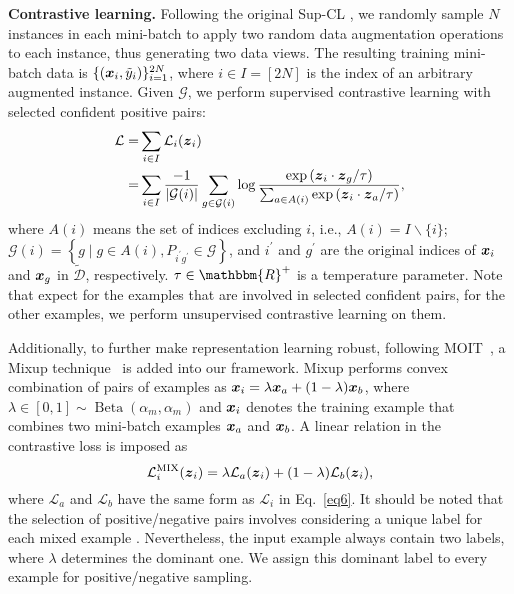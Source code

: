\documentclass[10pt,twocolumn,letterpaper]{article}
\newcommand{\myPara}[1]{\vspace{.05in}\noindent\textbf{#1}}
\newcommand{\bm}[1]{\mbox{\boldmath{$#1$}}}
\begin{document}
\myPara{Contrastive learning.} Following the original Sup-CL \cite{Khosla2020}, we randomly sample $N$ instances in each mini-batch to apply two random data augmentation operations to each instance, thus generating two data views. The resulting training mini-batch data is $\{(\bm{x}_i, \tilde{y}_i)\}^{2N}_{i=1}$, where $i \in I=[2N]$ is the index of an arbitrary augmented instance.
Given $\mathcal{G}$, we perform supervised contrastive learning with selected confident positive pairs:
\begin{equation}\label{eq6}
	\begin{split}
	\mathcal{L}=&\sum_{i \in I}\mathcal{L}_i(\bm{z}_i)\\
	=&\sum_{i \in I} \frac{-1}{|\mathcal{G}(i)|} \sum_{g \in \mathcal{G}(i)} \log \frac{\exp \left(\bm{z}_i \cdot \bm{z}_g / \tau\right)}{\sum_{a \in A(i)} \exp \left(\bm{z}_i \cdot \bm{z}_a / \tau\right)},
\end{split}
\end{equation}
where $A(i)$ means the set of indices excluding $i$, i.e., $A(i) = I \backslash\{i\}$; $\mathcal{G}(i) = \left\{g \mid g\in A(i), P_{i^{\prime}g^{\prime}} \in \mathcal{G} \right\}$, and $i^{\prime}$ and $g^{\prime}$ are the original indices of $\bm{x}_i$ and $\bm{x}_g$ in $\widetilde{\mathcal{D}}$, respectively. $\tau \in \mathbbm{R}^{+}$ is a temperature parameter. Note that expect for the examples that are involved in selected confident pairs, for the other examples, we perform unsupervised contrastive learning \cite{chen2020simple} on them.

Additionally, to further make representation learning robust, following MOIT~\cite{Ortego2021}, a Mixup technique~\cite{zhang2018mixup} is added into our framework. Mixup performs convex combination of pairs of examples as $\bm{x}_{i}=\lambda \bm{x}_{a}+(1-\lambda) \bm{x}_{b}$, where 
$\lambda \in[0,1] \sim \operatorname{Beta}(\alpha_m, \alpha_m)$ and $\bm{x}_i$ denotes the training example that combines two mini-batch examples $\bm{x}_a$ and $\bm{x}_b$. A linear relation in the contrastive loss is imposed as 
\begin{equation}
	\mathcal{L}_{i}^{\mathrm{MIX}}(\bm{z}_i)=\lambda \mathcal{L}_{a}(\bm{z}_i)+(1-\lambda) \mathcal{L}_{b}(\bm{z}_i),
\end{equation}
where  $\mathcal{L}_{a}$ and $\mathcal{L}_{b}$ have the same
form as $\mathcal{L}_{i}$ in Eq.~\ref{eq6}. It should be noted that the selection of positive/negative
pairs involves considering a unique label for each mixed
example \cite{Ortego2021}. Nevertheless, the input example always contain
two labels, where $\lambda$ determines the dominant one. We assign this dominant label to every example for positive/negative sampling.
\end{document}

